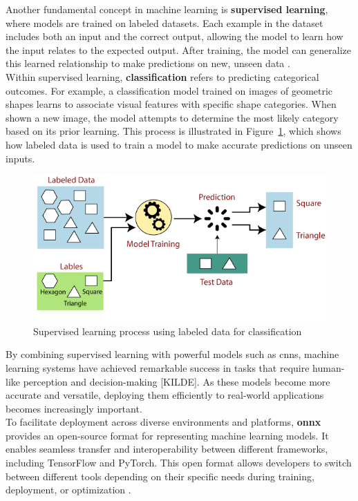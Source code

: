 Another fundamental concept in machine learning is \textbf{supervised learning}, where models are trained on labeled datasets. Each example in the dataset includes both an input and the correct output, allowing the model to learn how the input relates to the expected output. After training, the model can generalize this learned relationship to make predictions on new, unseen data \cite{geeksforgeeks:supervised-learning, google:supervised-learning}. \\

Within supervised learning, \textbf{classification} refers to predicting categorical outcomes. For example, a classification model trained on images of geometric shapes learns to associate visual features with specific shape categories. When shown a new image, the model attempts to determine the most likely category based on its prior learning. This process is illustrated in Figure~\ref{fig:supervised-learning}, which shows how labeled data is used to train a model to make accurate predictions on unseen inputs. \\

\begin{figure}[h!] \centering \includegraphics[width=0.75\linewidth]{figures/theory/machine-learning/supervised-learning.png} \caption[Supervised learning with labeled data]{Supervised learning process using labeled data for classification \cite{tpointtech:supervised-learning}} \label{fig:supervised-learning} \end{figure}

By combining supervised learning with powerful models such as \glspl{cnn}, machine learning systems have achieved remarkable success in tasks that require human-like perception and decision-making [KILDE]. As these models become more accurate and versatile, deploying them efficiently to real-world applications becomes increasingly important.  \\

To facilitate deployment across diverse environments and platforms, \textbf{\gls{onnx}} provides an open-source format for representing machine learning models. It enables seamless transfer and interoperability between different frameworks, including TensorFlow and PyTorch. This open format allows developers to switch between different tools depending on their specific needs during training, deployment, or optimization \cite{roboflow:onnx}.\\

